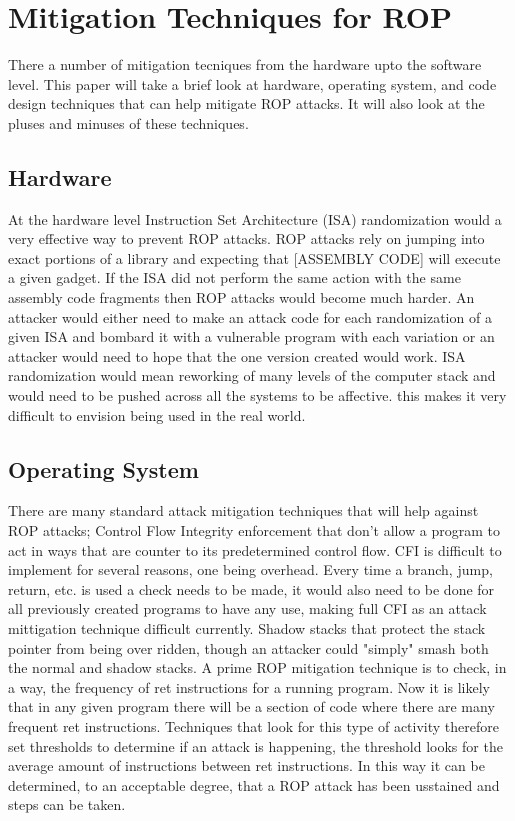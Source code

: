 \documentclass[11pt]{amsart}
\begin{document}
\section*{Mitigation Techniques for ROP}
There a number of mitigation tecniques from the hardware upto the software level. This paper will take a brief look at hardware, operating system, and code design techniques that can help mitigate ROP attacks. It will also look at the pluses and minuses of these techniques.
\subsection*{Hardware}
At the hardware level Instruction Set Architecture (ISA) randomization would a very effective way to prevent ROP attacks. ROP attacks rely on jumping into exact portions of a library and expecting that [ASSEMBLY CODE] will execute a given gadget. If the ISA did not perform the same action with the same assembly code fragments then ROP attacks would become much harder. An attacker would either need to make an attack code for each randomization of a given ISA and bombard it with a vulnerable program with each variation or an attacker would need to hope that the one version created would work. ISA randomization would mean reworking of many levels of the computer stack and would need to be pushed across all the systems to be affective. this makes it very difficult to envision being used in the real world.
\subsection*{Operating System}
There are many standard attack mitigation techniques that will help against ROP attacks; Control Flow Integrity enforcement that don't allow a program to act in ways that are counter to its predetermined control flow. CFI is difficult to implement for several reasons, one being overhead. Every time a branch, jump, return, etc. is used a check needs to be made, it would also need to be done for all previously created programs to have any use, making full CFI as an attack mittigation technique difficult currently. Shadow stacks that protect the stack pointer from being over ridden, though an attacker could "simply" smash both the normal and shadow stacks. \newline
A prime ROP mitigation technique is to check, in a way, the frequency of ret instructions for a running program. Now it is likely that in any given program there will be a section of code where there are many frequent ret instructions. Techniques that look for this type of activity therefore set thresholds to determine if an attack is happening, the threshold looks for the average amount of instructions between ret instructions. In this way it can be determined, to an acceptable degree, that a ROP attack has been usstained and steps can be taken.
\end{document}
